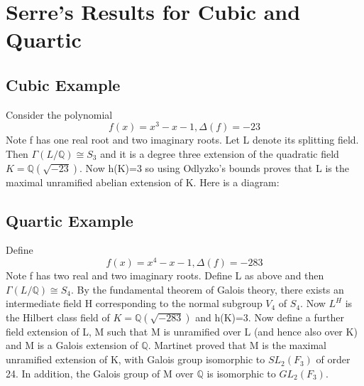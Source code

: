 \documentclass[12pt]{extarticle}
\newcommand{\<}{\langle}
\renewcommand{\>}{\rangle}
\theoremstyle{definition}
\begin{document}
\section{Serre's Results for Cubic and Quartic}
\subsection{Cubic Example}
Consider the polynomial \begin{equation}
 f(x)=x^3-x-1, \Delta(f)=-23
\end{equation}
Note f has one real root and two imaginary roots. Let L denote its splitting field. Then $\Gamma(L/\mathbb{Q})\cong S_3$ and it is a degree three extension of the quadratic field $K= \mathbb{Q}(\sqrt{-23})$. Now h(K)=3 so using Odlyzko's bounds proves that L is the maximal unramified abelian extension of K. Here is a diagram:
\begin{center}
\end{center}
\subsection{Quartic Example}
Define  \begin{equation}
    f(x)=x^4-x-1, \Delta(f)=-283
\end{equation}
Note f has two real and two imaginary roots. Define L as above and then $\Gamma(L/\mathbb{Q})\cong S_4$. By the fundamental theorem of Galois theory, there exists an intermediate field H corresponding to the normal subgroup $V_4$ of $S_4$. Now $L^H$ is the Hilbert class field of $K= \mathbb{Q}(\sqrt{-283})$ and h(K)=3. Now define a further field extension of L, M such that M is unramified over L (and hence also over K) and M is a Galois extension of $\mathbb{Q}$. Martinet proved that M is the maximal unramified extension of K, with Galois group isomorphic to $SL_2(F_3)$ of order 24. In addition, the Galois group of M over $\mathbb{Q}$ is isomorphic to $GL_2(F_3)$. 
\begin{center}
\end{center}
\end{document}
